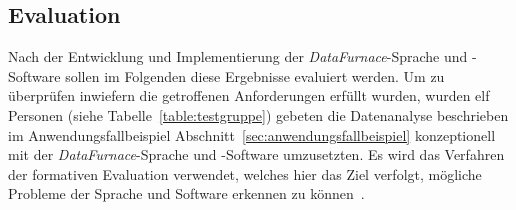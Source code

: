 \documentclass[
  language=german, %
  type=bachelor,%
  ngerman
]{isthesis}
\begin{document}
\begin{content}
%  


\chapter{Evaluation}\label{ch:evaluation}

Nach der Entwicklung und Implementierung der \textit{DataFurnace}-Sprache und
-Software sollen im Folgenden diese Ergebnisse evaluiert werden. Um zu
überprüfen inwiefern die getroffenen Anforderungen erfüllt wurden, wurden elf
Personen (siehe Tabelle~\ref{table:testgruppe}) gebeten die Datenanalyse
beschrieben im Anwendungsfallbeispiel
Abschnitt~\ref{sec:anwendungsfallbeispiel} konzeptionell mit der
\textit{DataFurnace}-Sprache und -Software umzusetzten. Es wird das Verfahren
der formativen Evaluation verwendet, welches hier das Ziel verfolgt, mögliche
Probleme der Sprache und Software erkennen zu können~\cite[][S. 9]{hegner2003methoden}.


\end{content}
\end{document}
